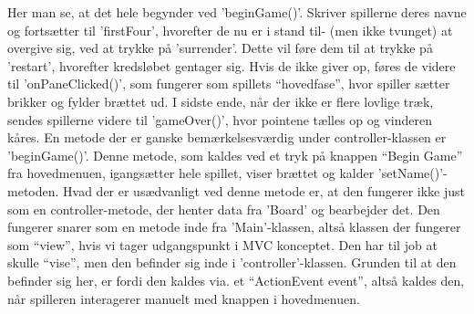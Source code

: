 Her man se, at det hele begynder ved 'beginGame()'. Skriver spillerne deres navne og fortsætter til 'firstFour', hvorefter de nu er i stand til- (men ikke tvunget) at overgive sig, ved at trykke på 'surrender'. Dette vil føre dem til at trykke på 'restart', hvorefter kredsløbet gentager sig. Hvis de ikke giver op, føres de videre til 'onPaneClicked()', som fungerer som spillets ``hovedfase'', hvor spiller sætter brikker og fylder brættet ud. I sidste ende, når der ikke er flere lovlige træk, sendes spillerne videre til 'gameOver()', hvor pointene tælles op og vinderen kåres.\newline
En metode der er ganske bemærkelsesværdig under controller-klassen er 'beginGame()'. Denne metode, som kaldes ved et tryk på knappen ``Begin Game'' fra hovedmenuen, igangsætter hele spillet, viser brættet og kalder 'setName()'-metoden. Hvad der er usædvanligt ved denne metode er, at den fungerer ikke just som en controller-metode, der henter data fra 'Board' og bearbejder det. Den fungerer snarer som en metode inde fra 'Main'-klassen, altså klassen der fungerer som ``view'', hvis vi tager udgangspunkt i MVC konceptet. Den har til job at skulle ``vise'', men den befinder sig inde i 'controller'-klassen. Grunden til at den befinder sig her, er fordi den kaldes via. et ``ActionEvent event'', altså kaldes den, når spilleren interagerer manuelt med knappen i hovedmenuen.
